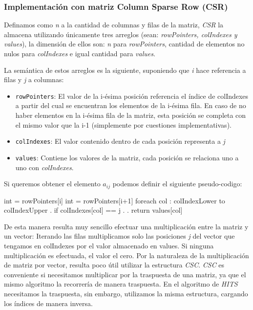 \subsubsection{Implementación con matriz Column Sparse Row (CSR)}

	Definamos como \textit{n} a la cantidad de columnas y filas de la matriz, \textit{CSR} la almacena utilizando únicamente tres arreglos (sean: \textit{rowPointers, colIndexes y values}), la dimensión de ellos son: \textit{n} para \textit{rowPointers}, cantidad de elementos no nulos para \textit{colIndexes} e igual cantidad para \textit{values}.

	La semántica de estos arreglos es la siguiente, suponiendo que \textit{i} hace referencia a filas y \textit{j} a columnas:

	\begin{itemize}
		\item \texttt{rowPointers}: El valor de la i-ésima posición referencia el índice de colIndexes a partir del cual se encuentran los elementos de la i-ésima fila. En caso de no haber elementos en la i-ésima fila de la matriz, esta posición se completa con el mismo valor que la i-1 (simplemente por cuestiones implementativas).
		\item \texttt{colIndexes}: El valor contenido dentro de cada posición representa a \textit{j}
		\item \texttt{values}: Contiene los valores de la matriz, cada posición se relaciona uno a uno con \textit{colIndexes}.
	\end{itemize}

	Si queremos obtener el elemento $a_{ij}$ podemos definir el siguiente pseudo-codigo:

	\vspace{\baselineskip}
	\begin{codebox}
	\li int  = rowPointers[i]
	\li int  = rowPointers[i+1]
	\li foreach col : colIndexLower to colIndexUpper
	\li .	if  colIndexes[col] == j
	\li .	.	return values[col]
	\End
	\end{codebox} 
	\vspace{\baselineskip}

	De esta manera resulta muy sencillo efectuar una multiplicación entre la matriz y un vector: Iterando las filas multiplicamos solo las posiciones \textit{j} del vector que tengamos en colIndexes por el valor almacenado en values. Si ninguna multiplicación es efectuada, el valor el cero. Por la naturaleza de la multiplicación de matriz por vector, resulta poco útil utilizar la estructura \textit{CSC}. \textit{CSC} es conveniente si necesitamos multiplicar por la traspuesta de una matriz, ya que el mismo algoritmo la recorrería de manera traspuesta. En el algoritmo de \textit{HITS} necesitamos la traspuesta, sin embargo, utilizamos la misma estructura, cargando los índices de manera inversa.

